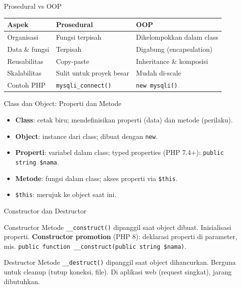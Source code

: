 \documentclass[handout]{beamer}
\begin{document}
\begin{frame}{Prosedural vs OOP}
	\small
	\begin{tabular}{|l|l|l|}
		\hline
		\textbf{Aspek} & \textbf{Prosedural} & \textbf{OOP} \\
		\hline
		Organisasi & Fungsi terpisah & Dikelompokkan dalam class \\
		\hline
		Data \& fungsi & Terpisah & Digabung (encapsulation) \\
		\hline
		Reusabilitas & Copy-paste & Inheritance \& komposisi \\
		\hline
		Skalabilitas & Sulit untuk proyek besar & Mudah di-scale \\
		\hline
		Contoh PHP & \texttt{mysqli\_connect()} & \texttt{new mysqli()} \\
		\hline
	\end{tabular}
\end{frame}

\begin{frame}{Class dan Object: Properti dan Metode}
	\begin{itemize}
		\item \textbf{Class}: cetak biru; mendefinisikan properti (data) dan metode (perilaku).
		\item \textbf{Object}: instance dari class; dibuat dengan \texttt{new}.
		\item \textbf{Properti}: variabel dalam class; typed properties (PHP 7.4+): \texttt{public string \$nama}.
		\item \textbf{Metode}: fungsi dalam class; akses properti via \texttt{\$this}.
		\item \texttt{\$this}: merujuk ke object saat ini.
	\end{itemize}
\end{frame}

\begin{frame}{Constructor dan Destructor}
	\begin{block}{Constructor}
		Metode \texttt{\_\_construct()} dipanggil saat object dibuat. Inisialisasi properti. \textbf{Constructor promotion} (PHP 8): deklarasi properti di parameter, mis. \texttt{public function \_\_construct(public string \$nama)}.
	\end{block}
	\begin{block}{Destructor}
		Metode \texttt{\_\_destruct()} dipanggil saat object dihancurkan. Berguna untuk cleanup (tutup koneksi, file). Di aplikasi web (request singkat), jarang dibutuhkan.
	\end{block}
\end{frame}
\end{document}
